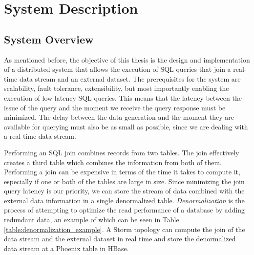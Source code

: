 \chapter{System Description}\label{chapter:system}

\section{System Overview}

As mentioned before, the objective of this thesis is the design and implementation of a distributed system that allows the execution of SQL queries that join a real-time data stream and an external dataset. The prerequisites for the system are scalability, fault tolerance, extensibility, but most importantly enabling the execution of low latency SQL queries. This means that the latency between the issue of the query and the moment we receive the query response must be minimized. The delay between the data generation and the moment they are available for querying must also be as small as possible, since we are dealing with a real-time data stream.

Performing an SQL join combines records from two tables. The join effectively creates a third table which combines the information from both of them. Performing a join can be expensive in terms of the time it takes to compute it, especially if one or both of the tables are large in size. Since minimizing the join query latency is our priority, we can store the stream of data combined with the external data information in a single denormalized table. \emph{Denormalization} is the process of attempting to optimize the read performance of a database by adding redundant data, an example of which can be seen in Table \ref{table:denormalization_example}. A Storm topology can compute the join of the data stream and the external dataset in real time and store the denormalized data stream at a Phoenix table in HBase.

